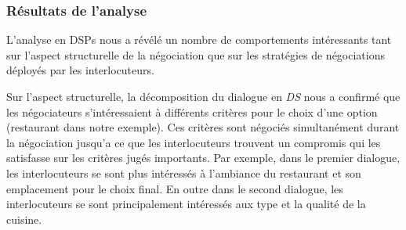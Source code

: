 %		 
%
%		
%		
%		
%		
%
%
%
	\subsubsection{Résultats de l'analyse}
		L'analyse en DSPs nous a révélé un nombre de comportements intéressants tant sur l'aspect structurelle de la négociation que sur les stratégies de négociations déployés par les interlocuteurs. 	
		
		Sur l'aspect structurelle, la décomposition du dialogue en \emph{DS} nous a confirmé que les négociateurs s'intéressaient à différents critères pour le choix d'une option (restaurant dans notre exemple). Ces critères sont négociés simultanément durant la négociation jusqu'a ce que les interlocuteurs trouvent un compromis qui les satisfasse sur les critères jugés importants. 
		Par exemple, dans le premier dialogue, les interlocuteurs se sont plus intéressés à l'ambiance du restaurant et son emplacement pour le choix final. En outre dans le second dialogue, les interlocuteurs se sont principalement intéressés aux type et la qualité de la cuisine.
		    
